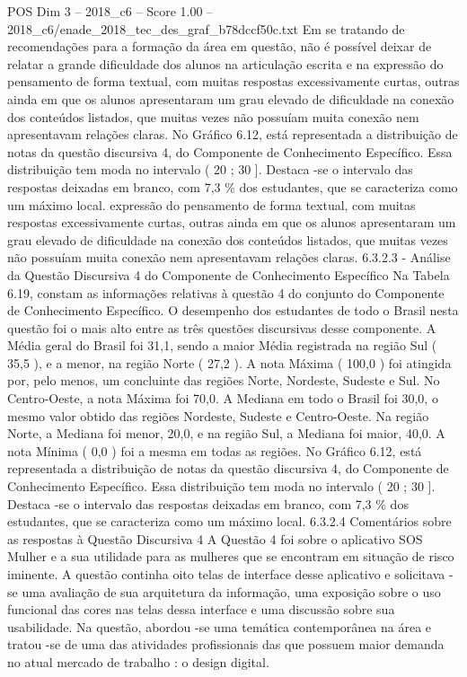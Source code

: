 \begin{textsample}{POS Dim 3 – 2018\_c6 – Score 1.00 – 2018\_c6/enade\_2018\_tec\_des\_graf\_b78dccf50c.txt}
Em se tratando de recomendações para a formação da área em questão, não é possível deixar de relatar a grande dificuldade dos alunos na articulação escrita e na expressão do pensamento de forma textual, com muitas respostas excessivamente curtas, outras ainda em que os alunos apresentaram um grau elevado de dificuldade na conexão dos conteúdos listados, que muitas vezes não possuíam muita conexão nem apresentavam relações claras.
No Gráfico 6.12, está representada a distribuição de notas da questão discursiva 4, do Componente de Conhecimento Específico.
Essa distribuição tem moda no intervalo ( 20 ; 30 ].
Destaca -se o intervalo das respostas deixadas em branco, com 7,3 \% dos estudantes, que se caracteriza como um máximo local. expressão do pensamento de forma textual, com muitas respostas excessivamente curtas, outras ainda em que os alunos apresentaram um grau elevado de dificuldade na conexão dos conteúdos listados, que muitas vezes não possuíam muita conexão nem apresentavam relações claras. 6.3.2.3 - Análise da Questão Discursiva 4 do Componente de Conhecimento Específico Na Tabela 6.19, constam as informações relativas à questão 4 do conjunto do Componente de Conhecimento Específico.
O desempenho dos estudantes de todo o Brasil nesta questão foi o mais alto entre as três questões discursivas desse componente.
A Média geral do Brasil foi 31,1, sendo a maior Média registrada na região Sul ( 35,5 ), e a menor, na região Norte ( 27,2 ).
A nota Máxima ( 100,0 ) foi atingida por, pelo menos, um concluinte das regiões Norte, Nordeste, Sudeste e Sul.
No Centro-Oeste, a nota Máxima foi 70,0.
A Mediana em todo o Brasil foi 30,0, o mesmo valor obtido das regiões Nordeste, Sudeste e Centro-Oeste.
Na região Norte, a Mediana foi menor, 20,0, e na região Sul, a Mediana foi maior, 40,0.
A nota Mínima ( 0,0 ) foi a mesma em todas as regiões.
No Gráfico 6.12, está representada a distribuição de notas da questão discursiva 4, do Componente de Conhecimento Específico.
Essa distribuição tem moda no intervalo ( 20 ; 30 ].
Destaca -se o intervalo das respostas deixadas em branco, com 7,3 \% dos estudantes, que se caracteriza como um máximo local. 6.3.2.4 Comentários sobre as respostas à Questão Discursiva 4 A Questão 4 foi sobre o aplicativo SOS Mulher e a sua utilidade para as mulheres que se encontram em situação de risco iminente.
A questão continha oito telas de interface desse aplicativo e solicitava -se uma avaliação de sua arquitetura da informação, uma exposição sobre o uso funcional das cores nas telas dessa interface e uma discussão sobre sua usabilidade.
Na questão, abordou -se uma temática contemporânea na área e tratou -se de uma das atividades profissionais das que possuem maior demanda no atual mercado de trabalho : o design digital.

\end{textsample}
